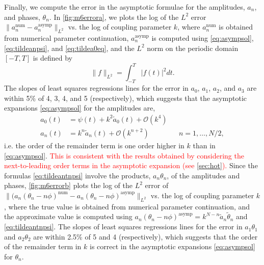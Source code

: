 \documentclass[11pt,reqno]{amsart}
\newcommand{\revised}[1]{ \textcolor{red}{#1} }
\begin{document}
Finally, we compute the error in the asymptotic formulae for the amplitudes, $a_n$, and phases, $\theta_n$. In \cref{fig:m6errora}, we plots the log of the $L^2$ error $\| a_n^{\text{num}} - a_n^{\text{asymp}} \|_{L^2}$ vs. the log of coupling parameter $k$, where $a_n^{\text{num}}$ is obtained from numerical parameter continuation, $a_n^{\text{asymp}}$ is computed using \cref{eq:asympsol}, \cref{eq:tildeanpsi}, and \cref{eq:tildea0eq}, and the $L^2$ norm on the periodic domain $[-T,T]$ is defined by
\[
\| f \|_{L^2} = \int_{-T}^T |f(t)|^2 dt.
\] 
The slopes of least squares regressions lines for the error in $a_0$, $a_1$, $a_2$, and $a_3$ are within 5\% of 4, 3, 4, and 5 (respectively), which suggests that the asymptotic expansions \cref{eq:asympsol} for the amplitudes are,
\begin{equation}\label{eq:asympsol2}
\begin{aligned}
a_0(t) &= \psi(t) + k^2 \widetilde{a}_0(t) + \mathcal{O}(k^4) \\
a_n(t) &= k^n \widetilde{a}_n(t) + \mathcal{O}(k^{n+2}) && n = 1, \dots, N/2,
\end{aligned}
\end{equation}
i.e. the order of the remainder term is one order higher in $k$ than in \cref{eq:asympsol}. 
\revised{
This is consistent with the results obtained by considering the next-to-leading order terms in the asymptotic expansion (see \cref{sec:hot}).
}
Since the formulas \cref{eq:tildeantnpsi} involve the products, $a_n \theta_n$, of the amplitudes and phases, \cref{fig:m6errorb} plots the log of the $L^2$ error of $\| (a_n (\theta_n - n \phi)^{\text{num}} - a_n(\theta_n - n \phi)^{\text{asymp}}\|_{L^2}$ vs. the log of coupling parameter $k$, where the true value is obtained from numerical parameter continuation, and the approximate value is computed using 
$a_n (\theta_n - n \phi )^{\text{asymp}} = k^{N-n} \widetilde{a}_n \widetilde{\theta}_n$ and \cref{eq:tildeantnpsi}. The slopes of least squares regressions lines for the error in $a_1\theta_1$ and $a_2\theta_2$ are within 2.5\% of 5 and 4 (respectively), which suggests that the order of the remainder term in $k$ is correct in the asymptotic expansions \cref{eq:asympsol} for $\theta_n$.
\end{document}
